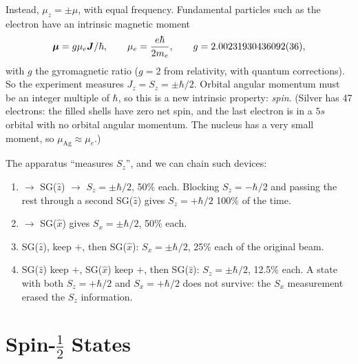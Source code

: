 \begin{fact}
Instead, $\mu_z = \pm\mu$, with equal frequency. Fundamental particles such as the electron have an intrinsic magnetic moment
\[
    \bm{\mu} = g\mu_e\vect{J}/\hbar,
    \qquad
    \mu_e = \frac{e\hbar}{2m_e},
    \qquad
    g = 2.00231930436092(36),
\]
with $g$ the gyromagnetic ratio ($g = 2$ from relativity, with quantum corrections). So the experiment measures $J_z = S_z = \pm\hbar/2$. Orbital angular momentum must be an integer multiple of $\hbar$, so this is a new intrinsic property: \emph{spin}. (Silver has 47 electrons: the filled shells have zero net spin, and the last electron is in a $5s$ orbital with no orbital angular momentum. The nucleus has a very small moment, so $\mu_{\text{Ag}}\approx\mu_e$.)
\end{fact}

The apparatus ``measures $S_z$'', and we can chain such devices:
\begin{enumerate}
    \item $\to$ SG($\hat{z}$) $\to$ $S_z = \pm\hbar/2$, 50\% each. Blocking $S_z = -\hbar/2$ and passing the rest through a second SG($\hat{z}$) gives $S_z = +\hbar/2$ 100\% of the time.
    \item $\to$ SG($\hat{x}$) gives $S_x = \pm\hbar/2$, 50\% each.
    \item SG($\hat{z}$), keep $+$, then SG($\hat{x}$): $S_x = \pm\hbar/2$, 25\% each of the original beam.
    \item SG($\hat{z}$) keep $+$, SG($\hat{x}$) keep $+$, then SG($\hat{z}$): $S_z = \pm\hbar/2$, 12.5\% each. A state with both $S_z = +\hbar/2$ and $S_x = +\hbar/2$ does not survive: the $S_x$ measurement erased the $S_z$ information.
\end{enumerate}

\section{Spin-\texorpdfstring{$\tfrac12$}{1/2} States}
\label{sec:spin-half-intro}

